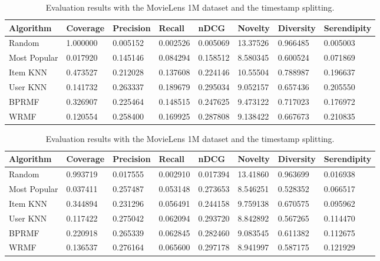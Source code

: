 \begin{table}
\centering
\begin{tabular}{@{}llllllll@{}}
\toprule
Algorithm    & Coverage & Precision & Recall   & nDCG     & Novelty  & Diversity & Serendipity \\ \midrule
Random       & 1.000000 & 0.005152  & 0.002526 & 0.005069 & 13.37526 & 0.966485  & 0.005003    \\
Most Popular & 0.017920 & 0.145146  & 0.084294 & 0.158512 & 8.580345 & 0.600524  & 0.071869    \\
Item KNN     & 0.473527 & 0.212028  & 0.137608 & 0.224146 & 10.55504 & 0.788987  & 0.196637    \\
User KNN     & 0.141732 & 0.263337  & 0.189679 & 0.295034 & 9.052157 & 0.657436  & 0.205550    \\
BPRMF        & 0.326907 & 0.225464  & 0.148515 & 0.247625 & 9.473122 & 0.717023  & 0.176972    \\
WRMF         & 0.120554 & 0.258400  & 0.169925 & 0.287808 & 9.138422 & 0.667673  & 0.210835    \\ \bottomrule
\end{tabular}
\caption[Evaluation with MovieLens 1M and random splitting]{Evaluation results with the MovieLens 1M dataset and a random splitting.}
\label{lab:tab:movielens-random}

\bigskip\bigskip

\begin{tabular}{@{}llllllll@{}}
\toprule
Algorithm    & Coverage & Precision & Recall   & nDCG     & Novelty  & Diversity & Serendipity \\ \midrule
Random       & 0.993719 & 0.017555  & 0.002910 & 0.017394 & 13.41860 & 0.963699  & 0.016938    \\
Most Popular & 0.037411 & 0.257487  & 0.053148 & 0.273653 & 8.546251 & 0.528352  & 0.066517    \\
Item KNN     & 0.344894 & 0.231296  & 0.056491 & 0.244158 & 9.759138 & 0.670575  & 0.095962    \\
User KNN     & 0.117422 & 0.275042  & 0.062094 & 0.293720 & 8.842892 & 0.567265  & 0.114470    \\
BPRMF        & 0.220918 & 0.265339  & 0.062845 & 0.282460 & 9.083545 & 0.611382  & 0.112675    \\
WRMF         & 0.136537 & 0.276164  & 0.065600 & 0.297178 & 8.941997 & 0.587175  & 0.121929    \\ \bottomrule
\end{tabular}
\caption[Evaluation with MovieLens 1M and timestamp splitting]{Evaluation results with the MovieLens 1M dataset and the timestamp splitting.}
\label{lab:tab:movielens-timestamp}
\end{table}

